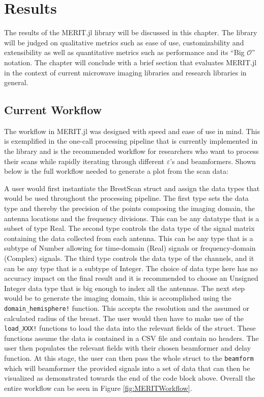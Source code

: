 \setcounter{chapter}{4}
\setcounter{section}{0}
\setcounter{subsection}{0}
\chapter*{Results}
The results of the MERIT.jl library will be discussed in this chapter. The library will be judged on qualitative metrics
such as ease of use, customizability and extensibility as well as quantitative metrics such as performance and its ``Big
$\mathcal{O}$'' notation. The chapter will conclude with a brief section that evaluates MERIT.jl in the context of
current microwave imaging libraries and research libraries in general.

\section{Current Workflow}
\label{CurrentWorkflow}
The workflow in MERIT.jl was designed with speed and ease of use in mind. This is exemplified in the one-call processing
pipeline that is currently implemented in the library and is the recommended workflow for researchers who want to
process their scans while rapidly iterating through different $\varepsilon$'s and beamformers. Shown below is the full
workflow needed to generate a plot from the scan data:

A user would first instantiate the BrestScan struct and assign the data types that would be used throughout the
processing pipeline. The first type sets the data type and thereby the precision of the points composing the imaging
domain, the antenna locations and the frequency divisions. This can be any datatype that is a subset of type Real. The
second type controls the data type of the signal matrix containing the data collected from each antenna. This can be any
type that is a subtype of Number allowing for time-domain (Real) signals or frequency-domain (Complex) signals. The
third type controls the data type of the channels, and it can be any type that is a subtype of Integer. The choice of
data type here has no accuracy impact on the final result and it is recommended to choose an Unsigned Integer data type
that is big enough to index all the antennas. The next step would be to generate the imaging domain, this is
accomplished using the \lstinline[language=Julia]{domain_hemisphere!} function. This accepts the resolution and the
assumed or calculated radius of the breast. The user would then have to make use of the
\lstinline[language=Julia]{load_XXX!} functions to load the data into the relevant fields of the struct. These functions
assume the data is contained in a CSV file and contain no headers. The user then populates the relevant fields with
their chosen beamformer and delay function. At this stage, the user can then pass the whole struct to the
\lstinline[language=Julia]{beamform} which will beamformer the provided signals into a set of data that can then be
visualized as demonstrated towards the end of the code block above. Overall the entire workflow can be seen in Figure
\ref{fig:MERITWorkflow}.


